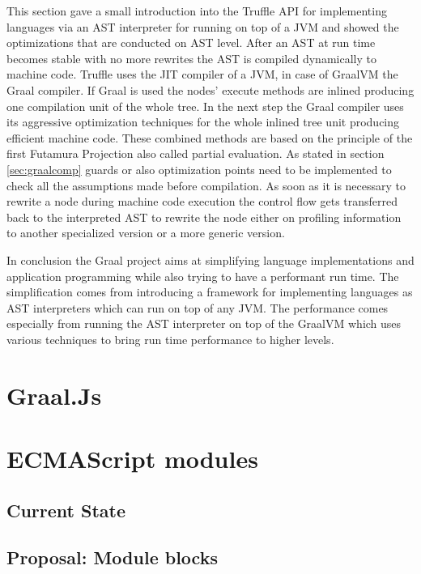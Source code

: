 This section gave a small introduction into the Truffle API for implementing languages via an AST interpreter for running on top of a JVM and showed the optimizations that are conducted on AST level. After an AST at run time becomes stable with no more rewrites the AST is compiled dynamically to machine code. Truffle uses the JIT compiler of a JVM, in case of GraalVM the Graal compiler. If Graal is used the nodes' execute methods are inlined producing one compilation unit of the whole tree. In the next step the Graal compiler uses its aggressive optimization techniques for the whole inlined tree unit producing efficient machine code. These combined methods are based on the principle of the first Futamura Projection also called partial evaluation. \cite{FutaPart} As stated in section \ref{sec:graalcomp} guards or also optimization points need to be implemented to check all the assumptions made before compilation. As soon as it is necessary to rewrite a node during machine code execution the control flow gets transferred back to the interpreted AST to rewrite the node either on profiling information to another specialized version or a more generic version. \cite{ChambDebug}

In conclusion the Graal project aims at simplifying language implementations and application programming while also trying to have a performant run time. The simplification comes from introducing a framework for implementing languages as AST interpreters which can run on top of any JVM. The performance comes especially from running the AST interpreter on top of the GraalVM which uses various techniques to bring run time performance to higher levels.
\section{Graal.Js}

\section{ECMAScript modules}
\subsection{Current State}

\subsection{Proposal: Module blocks}